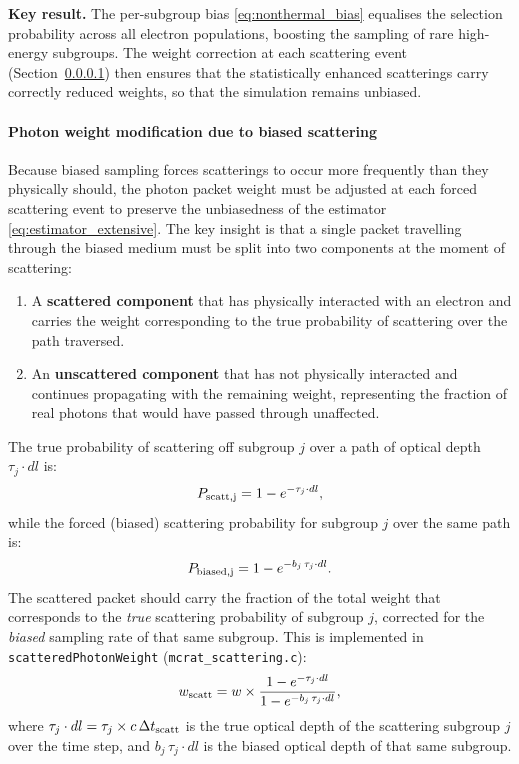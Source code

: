 \documentclass[12pt,a4paper]{article}
\newcommand{\code}[1]{\texttt{#1}}
\newenvironment{keyresult}{%
	\begin{framed}\noindent\textbf{Key result.}\quad}
	{\end{framed}}
\begin{document}
\begin{keyresult}
	The per-subgroup bias \eqref{eq:nonthermal_bias} equalises the selection
	probability across all electron populations, boosting the sampling of
	rare high-energy subgroups. The weight correction at each scattering event (Section~\ref{sec:weight_bias_modification})
	then ensures that the statistically enhanced scatterings carry correctly
	reduced weights, so that the simulation remains unbiased.
\end{keyresult}

\paragraph{Photon weight modification due to biased scattering}
\label{sec:weight_bias_modification}

Because biased sampling forces scatterings to occur more frequently than
they physically should, the photon packet weight must be adjusted at each
forced scattering event to preserve the unbiasedness of the estimator
\eqref{eq:estimator_extensive}.  The key insight is that a single packet travelling
through the biased medium must be split into two components at the moment
of scattering:

\begin{enumerate}[leftmargin=2em]
	\item A \textbf{scattered component} that has physically interacted
	with an electron and carries the weight corresponding to the true
	probability of scattering over the path traversed.
	
	\item An \textbf{unscattered component} that has not physically
	interacted and continues propagating with the remaining weight,
	representing the fraction of real photons that would have passed
	through unaffected.
\end{enumerate}

The true probability of scattering off subgroup $j$ over a path of
optical depth $\tau_j \cdot dl$ is:
\begin{equation}
	P_{\rm scatt,j} = 1 - e^{-\tau_j \cdot dl},
	\label{eq:p_scatt}
\end{equation}
while the forced (biased) scattering probability for subgroup $j$ over
the same path is:
\begin{equation}
	P_{\rm biased,j} = 1 - e^{-b_j\,\tau_j \cdot dl}.
	\label{eq:p_biased}
\end{equation}
The scattered packet should carry the fraction of the total weight that
corresponds to the \emph{true} scattering probability of subgroup $j$,
corrected for the \emph{biased} sampling rate of that same subgroup.
This is implemented in \code{scatteredPhotonWeight}
(\code{mcrat\_scattering.c}):
\begin{equation}
	w_{\rm scatt} = w \times
	\frac{1 - e^{-\tau_j \cdot dl}}
	{1 - e^{-b_j\,\tau_j \cdot dl}},
	\label{eq:w_scattered}
\end{equation}
where $\tau_j \cdot dl = \tau_j \times c\,\Delta t_{\rm scatt}$ is the
true optical depth of the scattering subgroup $j$ over the time step, and
$b_j\,\tau_j \cdot dl$ is the biased optical depth of that same subgroup.
\end{document}
